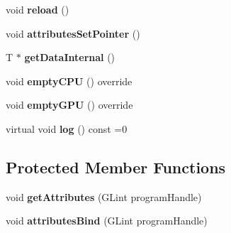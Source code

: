 \begin{DoxyCompactItemize}
\item 
void {\bfseries reload} ()\hypertarget{classflw_1_1flc_1_1TVertexBuffer_a91f037ceed8a6ed2a0192560eca4467b}{}\label{classflw_1_1flc_1_1TVertexBuffer_a91f037ceed8a6ed2a0192560eca4467b}

\item 
void {\bfseries attributes\+Set\+Pointer} ()\hypertarget{classflw_1_1flc_1_1TVertexBuffer_aec3905d333ee85b9ba835ce8f16a8983}{}\label{classflw_1_1flc_1_1TVertexBuffer_aec3905d333ee85b9ba835ce8f16a8983}

\item 
T $\ast$ {\bfseries get\+Data\+Internal} ()\hypertarget{classflw_1_1flc_1_1TVertexBuffer_af626b99a034e30125467ffc257c9d549}{}\label{classflw_1_1flc_1_1TVertexBuffer_af626b99a034e30125467ffc257c9d549}

\item 
void {\bfseries empty\+C\+PU} () override\hypertarget{classflw_1_1flc_1_1TVertexBuffer_ad6ea1e0a7762f0cb345dc101ad0cba2a}{}\label{classflw_1_1flc_1_1TVertexBuffer_ad6ea1e0a7762f0cb345dc101ad0cba2a}

\item 
void {\bfseries empty\+G\+PU} () override\hypertarget{classflw_1_1flc_1_1TVertexBuffer_ab9fdab1ac2a39e0ae297bfb241ba3bc3}{}\label{classflw_1_1flc_1_1TVertexBuffer_ab9fdab1ac2a39e0ae297bfb241ba3bc3}

\item 
virtual void {\bfseries log} () const =0\hypertarget{classflw_1_1flc_1_1TVertexBuffer_a39e0298b5e8fa89111f666653e93d80a}{}\label{classflw_1_1flc_1_1TVertexBuffer_a39e0298b5e8fa89111f666653e93d80a}

\end{DoxyCompactItemize}
\subsection*{Protected Member Functions}
\begin{DoxyCompactItemize}
\item 
void {\bfseries get\+Attributes} (G\+Lint program\+Handle)\hypertarget{classflw_1_1flc_1_1TVertexBuffer_a56620ad26640704fd46a5f59a69ea674}{}\label{classflw_1_1flc_1_1TVertexBuffer_a56620ad26640704fd46a5f59a69ea674}

\item 
void {\bfseries attributes\+Bind} (G\+Lint program\+Handle)\hypertarget{classflw_1_1flc_1_1TVertexBuffer_a8ca8c56c8818afe5270b7fdd8f56015f}{}\label{classflw_1_1flc_1_1TVertexBuffer_a8ca8c56c8818afe5270b7fdd8f56015f}

\end{DoxyCompactItemize}
